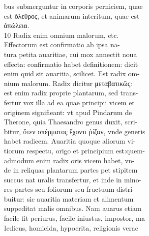 \documentclass{article}
\begin{document}
\begin{pages}
                bus submerguntur in corporis perniciem, quae \\
                est ὄλεθρος, et animarum interitum, quae est \\
                ἀπώλεια. \\
                10 Radix enim omnium malorum, etc. \\
                Effectorum est confirmatio ab ipsa na- \\
                tura petita auaritiae, cui mox annectit noua \\
                effecta: confirmatio habet definitionem: dicit \\
                enim quid sit auaritia, scilicet. Est radix om- \\
                nium malorum. Radix dicitur μεταβατικῶς: \\
                est enim radix proprie plantarum, sed trans- \\
                fertur vox illa ad ea quae principii vicem et \\
                originem signifieant: vt apud Pindarum de \\
                Therone, quia Thaesandro genus duxit, scri- \\
                bitur, ὅτεν σπέρματος ἔχοντι ῥίζαν, vnde generis \\
                habet radicem. Auaritia quoque aliorum vi- \\
                tiorum respectu, origo et principium est:quem- \\
                admodum enim radix oris vicem habet, vn- \\
                de in reliquas plantarum partes pet stipitem \\
                succus nat uralis transfertur, et inde in mino- \\
                res partes seu foliorum seu fructuum distri- \\
                buitur: sic auaritia materiam et alimentum \\
                suppeditat malis omnibus. Nam auarus etiam \\
                facile fit periurus, facile iniustus, impostor, ma \\
                Iedicus, homicida, hypocrita, religionis verae \\

\end{pages}
\end{document}
